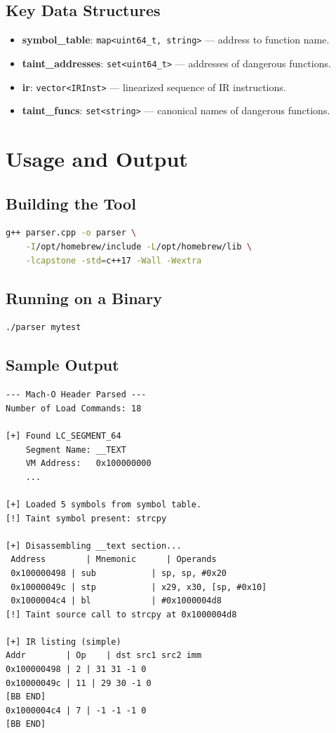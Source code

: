 \documentclass[12pt,a4paper]{article}
\begin{document}
\subsection{Key Data Structures}

\begin{itemize}
  \item \textbf{symbol\_table}: \texttt{map<uint64\_t, string>} --- address to function name.
  \item \textbf{taint\_addresses}: \texttt{set<uint64\_t>} --- addresses of dangerous functions.
  \item \textbf{ir}: \texttt{vector<IRInst>} --- linearized sequence of IR instructions.
  \item \textbf{taint\_funcs}: \texttt{set<string>} --- canonical names of dangerous functions.
\end{itemize}

\newpage

\section{Usage and Output}

\subsection{Building the Tool}

\begin{lstlisting}[language=bash]
g++ parser.cpp -o parser \
    -I/opt/homebrew/include -L/opt/homebrew/lib \
    -lcapstone -std=c++17 -Wall -Wextra
\end{lstlisting}

\subsection{Running on a Binary}

\begin{lstlisting}[language=bash]
./parser mytest
\end{lstlisting}

\subsection{Sample Output}

\begin{verbatim}
--- Mach-O Header Parsed ---
Number of Load Commands: 18

[+] Found LC_SEGMENT_64
    Segment Name: __TEXT
    VM Address:   0x100000000
    ...

[+] Loaded 5 symbols from symbol table.
[!] Taint symbol present: strcpy

[+] Disassembling __text section...
 Address        | Mnemonic      | Operands
 0x100000498 | sub           | sp, sp, #0x20
 0x10000049c | stp           | x29, x30, [sp, #0x10]
 0x1000004c4 | bl            | #0x1000004d8
[!] Taint source call to strcpy at 0x1000004d8

[+] IR listing (simple)
Addr        | Op    | dst src1 src2 imm
0x100000498 | 2 | 31 31 -1 0
0x10000049c | 11 | 29 30 -1 0
[BB END]
0x1000004c4 | 7 | -1 -1 -1 0
[BB END]
\end{verbatim}
\end{document}
